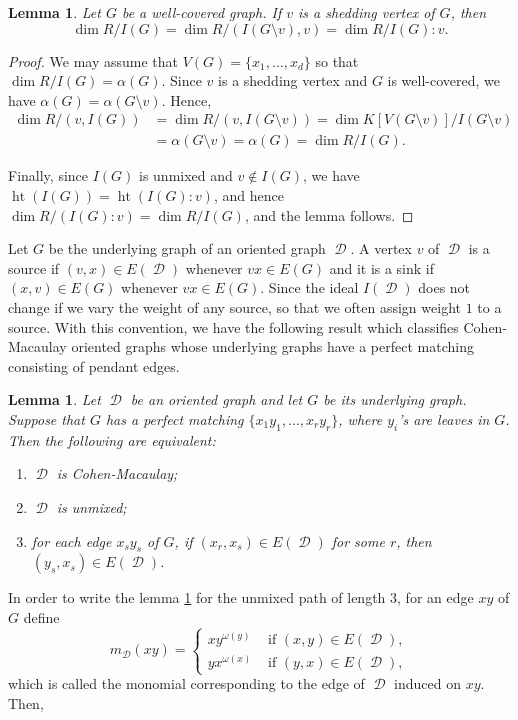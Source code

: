 \documentclass[12pt, amscd]{amsart}
\newtheorem{lem}[thm]{Lemma}
\theoremstyle{definition}
\DeclareMathOperator{\hgt}{ht}
\DeclareMathOperator{\D}{\mathcal{D}}
\newcommand{\0}{\bold{0}}
\begin{document}
\begin{lem} \label{dim} Let $G$ be a well-covered graph.  If $v$ is a shedding vertex of $G$, then 
$$\dim R/I(G) = \dim R/(I(G\setminus v),v)=\dim R/I(G):v.$$
\end{lem}
\begin{proof} We may assume that $V(G)=\{x_1,\ldots,x_d\}$ so that $\dim R/I(G)=\alpha(G)$. Since $v$ is a shedding vertex and $G$ is well-covered, we have $\alpha(G)=\alpha(G\setminus v)$. Hence,
\begin{align*}
\dim R/(v,I(G)) &= \dim R/(v,I(G\setminus v)) = \dim K[V(G\setminus v)]/ I(G\setminus v) \\
&= \alpha(G\setminus v) = \alpha(G) = \dim R/I(G).
\end{align*}

Finally,  since $I(G)$ is unmixed and $v\notin I(G)$, we have $\hgt(I(G)) = \hgt(I(G)\colon v)$, and hence
$\dim R/(I(G):v) = \dim R/I(G)$,  and the lemma follows.
\end{proof}

\medskip

Let $G$ be the underlying graph of an oriented graph $\D$. A vertex $v$ of $\D$ is a source if $(v,x) \in E(\D)$ whenever $vx\in E(G)$ and it is a sink if $(x,v)\in E(G)$ whenever $vx\in E(G)$. Since the ideal $I(\D)$ does not change if we vary the weight of any source, so that we often assign weight $1$ to a source. With this convention, we have the following result which classifies Cohen-Macaulay oriented graphs whose underlying graphs have a perfect matching consisting of pendant edges.

\begin{lem}\label{H2} \cite[Theorem 1.1]{HLMRV} Let $\D$ be an oriented graph and let $G$ be its underlying graph. Suppose that $G$ has a perfect matching 
$\{x_1y_1,\ldots , x_ry_r\}$, where $y_i$'s are leaves in $G$. Then the following are equivalent:
\begin{enumerate}
\item $\D$ is Cohen-Macaulay;
\item $\D$ is unmixed;
\item for each edge $x_sy_s$ of $G$, if $(x_r,x_s)\in E(\D)$ for some $r$, then $(y_s,x_s)\in E(\D)$.
\end{enumerate}
\end{lem}

In order to write the lemma \ref{H2} for the unmixed path of length $3$, for an edge $xy$ of $G$ define
$$
m_{\D}(xy) = \begin{cases}
xy^{\omega(y)} & \text{ if } (x,y)\in E(\D),\\
yx^{\omega(x)} & \text{ if } (y,x) \in E(\D),
\end{cases}
$$
which is called the monomial corresponding to the edge of $\D$ induced on $xy$. Then,
\end{document}
